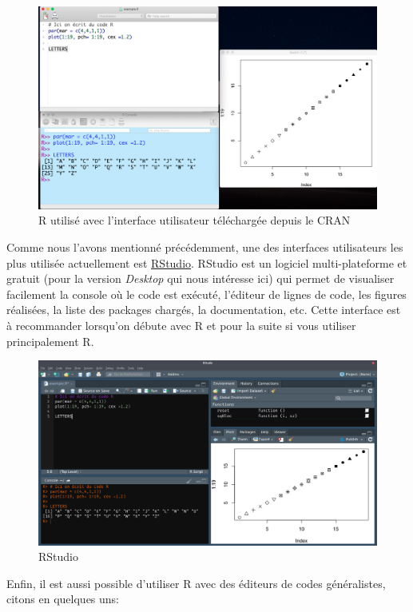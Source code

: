 \documentclass[]{article}
\begin{document}
\begin{figure}
\centering
\includegraphics{img/chap2/rgui.png}
\caption{R utilisé avec l'interface utilisateur téléchargée depuis le CRAN}
\end{figure}

Comme nous l'avons mentionné précédemment, une des interfaces utilisateurs les plus utilisée actuellement est \href{https://www.rstudio.com}{RStudio}. RStudio est un logiciel multi-plateforme et gratuit (pour la version \emph{Desktop} qui nous intéresse ici) qui permet de visualiser facilement la console où le code est exécuté, l'éditeur de lignes de code, les figures réalisées, la liste des packages chargés, la documentation, etc. Cette interface est à recommander lorsqu'on débute avec R et pour la suite si vous utiliser principalement R.

\begin{figure}
\centering
\includegraphics{img/chap2/rstudio.png}
\caption{RStudio}
\end{figure}

Enfin, il est aussi possible d'utiliser R avec des éditeurs de codes généralistes, citons en quelques uns:
\end{document}
